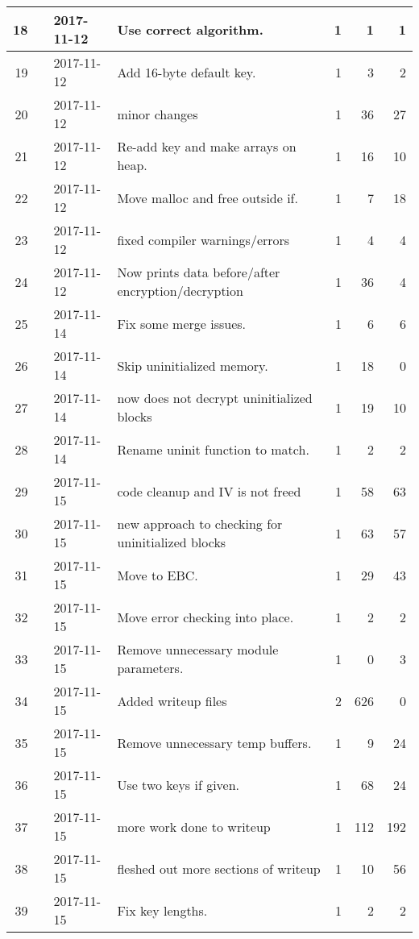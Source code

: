\documentclass[letterpaper,10pt,titlepage,draftclsnofoot,onecolumn]{article}
\begin{document}
\begin{longtable}{|rlllrrr|}
\hline 18 &  & 2017-11-12 & Use correct algorithm. & 1 & 1 & 1 \\
\hline 19 &  & 2017-11-12 & Add 16-byte default key. & 1 & 3 & 2 \\
\hline 20 &  & 2017-11-12 & minor changes & 1 & 36 & 27 \\
\hline 21 &  & 2017-11-12 & Re-add key and make arrays on heap. & 1 & 16 & 10 \\
\hline 22 &  & 2017-11-12 & Move malloc and free outside if. & 1 & 7 & 18 \\
\hline 23 &  & 2017-11-12 & fixed compiler warnings/errors & 1 & 4 & 4 \\
\hline 24 &  & 2017-11-12 & Now prints data before/after encryption/decryption & 1 & 36 & 4 \\
\hline 25 &  & 2017-11-14 & Fix some merge issues. & 1 & 6 & 6 \\
\hline 26 &  & 2017-11-14 & Skip uninitialized memory. & 1 & 18 & 0 \\
\hline 27 &  & 2017-11-14 & now does not decrypt uninitialized blocks & 1 & 19 & 10 \\
\hline 28 &  & 2017-11-14 & Rename uninit function to match. & 1 & 2 & 2 \\
\hline 29 &  & 2017-11-15 & code cleanup and IV is not freed & 1 & 58 & 63 \\
\hline 30 &  & 2017-11-15 & new approach to checking for uninitialized blocks & 1 & 63 & 57 \\
\hline 31 &  & 2017-11-15 & Move to EBC. & 1 & 29 & 43 \\
\hline 32 &  & 2017-11-15 & Move error checking into place. & 1 & 2 & 2 \\
\hline 33 &  & 2017-11-15 & Remove unnecessary module parameters. & 1 & 0 & 3 \\
\hline 34 &  & 2017-11-15 & Added writeup files & 2 & 626 & 0 \\
\hline 35 &  & 2017-11-15 & Remove unnecessary temp buffers. & 1 & 9 & 24 \\
\hline 36 &  & 2017-11-15 & Use two keys if given. & 1 & 68 & 24 \\
\hline 37 &  & 2017-11-15 & more work done to writeup & 1 & 112 & 192 \\
\hline 38 &  & 2017-11-15 & fleshed out more sections of writeup & 1 & 10 & 56 \\
\hline 39 &  & 2017-11-15 & Fix key lengths. & 1 & 2 & 2 \\
\end{longtable}
\end{document}
